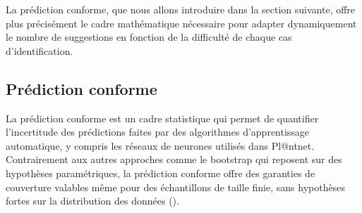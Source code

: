 \documentclass[a4paper,12pt]{article}
\begin{document}
\vspace{0.2cm}
\vspace{0.2cm}

La prédiction conforme, que nous allons introduire dans la section suivante, offre plus précisément le cadre mathématique nécessaire pour adapter dynamiquement le nombre de suggestions en fonction de la difficulté de chaque cas d'identification.


\subsection{Prédiction conforme}

La prédiction conforme est un cadre statistique qui permet de quantifier l'incertitude des prédictions faites par des algorithmes d'apprentissage automatique, y compris les réseaux de neurones utilisés dans Pl@ntnet. Contrairement aux autres approches comme le bootstrap qui reposent sur des hypothèses paramétriques, la prédiction conforme offre des garanties de couverture valables même pour des échantillons de taille finie, sans hypothèses fortes sur la distribution des données (\cite{ShaferVovk}).

\vspace{0.2cm}
\end{document}
